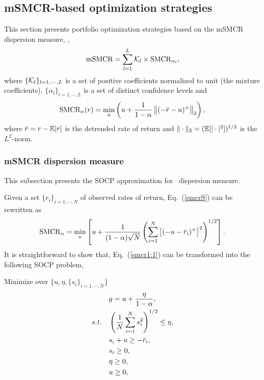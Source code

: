
\subsection{mSMCR-based optimization strategies}\label{S:mSMCR}

This section presents portfolio optimization strategies based on the
mSMCR dispersion measure, \ie,
\begin{equation}
    \mSMCR = \sum_{l=1}^L \cK_l \times \SMCR_{\alpha_l},
    \label{smcr0}
\end{equation}
where $\{{\cal K}_l\}_{l=1,\cdots,L}$ is a set of positive coefficients normalized to unit (the mixture coefficients),
$\{\alpha_l\}_{l=1,\cdots,L}$ is a set of distinct confidence levels  and
\begin{equation}
    \SMCR_\alpha(r) = \min_u\left( u + \frac{1}{1-\alpha} \left\| (-\br -u)^+ \right\|_2 \right),
    \label{smcrS}
\end{equation}
where ${\bar r} = r - {\mathbb E}[r]$ is the detrended rate of return and $\|\cdot\|_2 = ({\mathbb E}[|\cdot|^2])^{1/2}$ is the $L^2$-norm.

\BackToContents


\subsubsection{mSMCR dispersion measure}

This subsection presents the SOCP approximation for \mSMCR\ dispersion measure.

Given a set $\{r_i\}_{i=1,\cdots,N}$ of observed rates of return, Eq.~(\ref{smcrS}) can be rewritten as
\begin{equation}
    \SMCR_\alpha = \min_u\left[ u + \frac{1}{(1-\alpha)\sqrt{N}}\left( \sum_{i=1}^N \left[(-u - \br_i)^+\right]^2 \right)^{1/2} \right].
    \label{smcr1:1}
\end{equation}
It is straightforward to show that, Eq.~(\ref{smcr1:1}) can be transformed into the following SOCP problem,

\bigskip
\noindent Minimize over $\{u, \eta, \{s_i\}_{i=1,\cdots,N}\}$
\begin{subequations}\label{smcr1}
\begin{align}
    &g = u + \frac{\eta}{1-\alpha} , \label{smcr1a} \\
    \st &\left( \frac{1}{N}\sum_{i=1}^N s_i^2 \right)^{1/2} \leq \eta, \label{smcr1b} \\
        &s_i + u \geq -\br_i, \label{smcr1c} \\
        &s_i \geq 0, \label{smcr1d} \\
        &\eta \geq 0, \label{smcr1e} \\
        &u \geq 0, \label{smcr1f}
\end{align}
\end{subequations}

